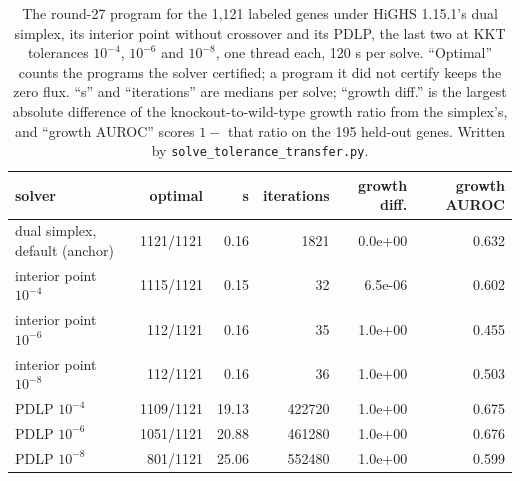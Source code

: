 \begin{table}[H]
  \centering
  \footnotesize
  \caption[The solve across tolerances]{The round-27 program for the 1,121 labeled genes under HiGHS 1.15.1's dual simplex, its interior point without crossover and its PDLP, the last two at KKT tolerances $10^{-4}$, $10^{-6}$ and $10^{-8}$, one thread each, 120 s per solve. ``Optimal'' counts the programs the solver certified; a program it did not certify keeps the zero flux. ``s'' and ``iterations'' are medians per solve; ``growth diff.'' is the largest absolute difference of the knockout-to-wild-type growth ratio from the simplex's, and ``growth AUROC'' scores $1 - $ that ratio on the 195 held-out genes. Written by \texttt{solve\_tolerance\_transfer.py}.}
  \label{tab:solve-tolerance-transfer-solvers}
  \begin{tabular}{@{}lrrrrr@{}}
    \hline
    solver & optimal & s & iterations & growth diff. & growth AUROC \\
    \hline
    dual simplex, default (anchor) & 1121/1121 & 0.16 & 1821 & 0.0e+00 & 0.632 \\
    interior point $10^{-4}$ & 1115/1121 & 0.15 & 32 & 6.5e-06 & 0.602 \\
    interior point $10^{-6}$ & 112/1121 & 0.16 & 35 & 1.0e+00 & 0.455 \\
    interior point $10^{-8}$ & 112/1121 & 0.16 & 36 & 1.0e+00 & 0.503 \\
    PDLP $10^{-4}$ & 1109/1121 & 19.13 & 422720 & 1.0e+00 & 0.675 \\
    PDLP $10^{-6}$ & 1051/1121 & 20.88 & 461280 & 1.0e+00 & 0.676 \\
    PDLP $10^{-8}$ & 801/1121 & 25.06 & 552480 & 1.0e+00 & 0.599 \\
    \hline
  \end{tabular}
\end{table}

